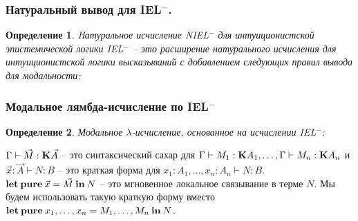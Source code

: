 \documentclass[10pt,pdf,utf8,russian,aspectratio=169]{beamer}
\newtheorem{defin}{Определение}
\begin{document}
\begin{frame}
  \frametitle{Натуральный вывод для IEL$^{-}$.}

  \begin{defin} Hатуральное исчисление NIEL$^{-}$ для интуиционистской эпистемической логики IEL$^{-}$ -- это
  расширение натурального исчисления для интуиционистской логики высказываний с добавлением следующих правил вывода для модальности:


    \begin{prooftree}
  \end{prooftree}

    \begin{prooftree}
    \end{prooftree}
  \end{defin}

\end{frame}


\begin{frame}
  \frametitle{Модальное лямбда-исчисление по IEL$^{-}$}

  \begin{defin} Модальное $\lambda$-исчисление, основанное на исчислении IEL$^{-}$:
      \begin{prooftree}
      \end{prooftree}

    \begin{prooftree}
    \end{prooftree}
  \end{defin}

  $\Gamma \vdash \vec{M} : {\bf K} \vec{A}$ -- это синтаксический сахар для $\Gamma \vdash M_1 : {\bf K}A_1,\dots,\Gamma \vdash M_n : {\bf K}A_n$ и $\vec{x} : \vec{A} \vdash N : B$ -- это краткая форма для $x_1 : A_1, \dots, x_n : A_n \vdash N : B$.
  ${\bf let \: pure \:} \vec{x} = \vec{M} {\: \bf in \: } N$ -- это мгновенное локальное связывание в терме $N$.
  Мы будем использовать такую краткую форму вместо ${\bf let \: pure\:} x_1,\dots,x_n = M_1,\dots,M_n {\: \bf in \:} N$.

\end{frame}
\end{document}
